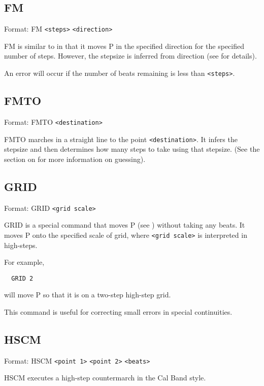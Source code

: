 \subsection{FM}\label{fm}

Format: FM \verb$<steps>$ \verb$<direction>$

FM is similar to  in that it moves P in the
specified direction for the specified number of steps.  However, the
stepsize is inferred from direction (see 
for details).

An error will occur if the number of beats remaining is less than
\verb$<steps>$.

\subsection{FMTO}\label{fmto}

Format: FMTO \verb$<destination>$

FMTO marches in a straight line to the point \verb$<destination>$.  It
infers the stepsize and then determines how many steps to take using
that stepsize.  (See the section on  for
more information on guessing).

\subsection{GRID}\label{grid}

Format: GRID \verb$<grid scale>$

GRID is a special command that moves P (see )
without taking any beats.  It moves P onto the specified scale of grid,
where \verb$<grid scale>$ is interpreted in high-steps.

For example,
\begin{verbatim}
  GRID 2
\end{verbatim}
will move P so that it is on a two-step high-step grid.

This command is useful for correcting small errors in special continuities.

\subsection{HSCM}\label{hscm}

Format: HSCM \verb$<point 1>$ \verb$<point 2>$ \verb$<beats>$

HSCM executes a high-step countermarch in the Cal Band style.

